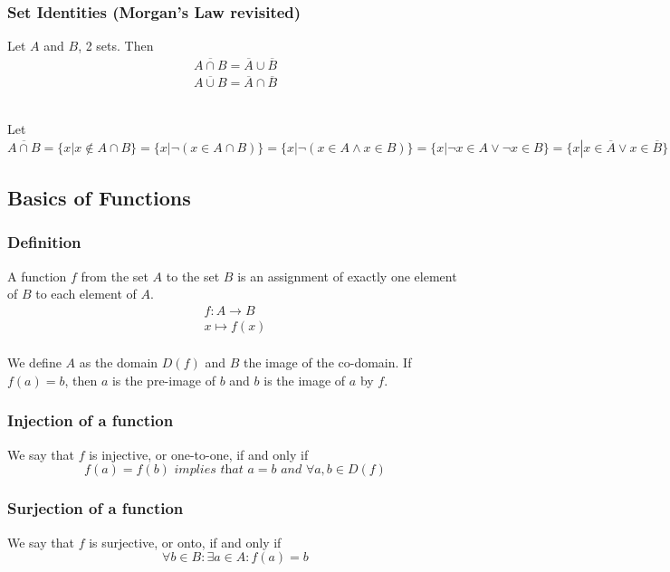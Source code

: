 \documentclass{article}
\begin{document}
\subsubsection{Set Identities (Morgan's Law revisited)} Let $ A $ and $ B $, 2 sets. Then
\begin{align}
\overline{A \cap B} = \overline{A} \cup \overline{B}\\
\overline{A \cup B} = \overline{A} \cap \overline{B}
\end{align}
\\
\begin{tcolorbox}[width=12.1cm]
Let $ \overline{A \cap B} = \{x | x \notin A \cap B\} = \{x | \neg(x \in A \cap B)\} = \{x | \neg(x \in A \wedge x \in B)\} = \{x | \neg x \in A \vee \neg x \in B\} = \{x | x \in \overline{A} \vee x \in \overline{B}\} = \{x | x \in \overline{A} \cup \overline{B}\} = \overline{A} \cup \overline{B} $
\end{tcolorbox}

\subsection{Basics of Functions}
\subsubsection{Definition} A function $ f $ from the set $ A $ to the set $ B $ is an assignment of exactly one element of $ B $ to each element of $ A $.
\begin{align}
f: A \rightarrow B\\
x \longmapsto f(x)
\end{align}
\\
We define $ A $ as the domain $ D(f) $ and $ B $ the image of the co-domain. If $ f(a) = b $, then $ a $ is the pre-image of $ b $ and $ b $ is the image of $ a $ by $ f $.

\subsubsection{Injection of a function} We say that $ f $ is injective, or one-to-one, if and only if
\begin{equation}
f(a) = f(b) \textit{ implies that  } a = b \textit{ and } \forall a,b \in D(f)
\end{equation}

\subsubsection{Surjection of a function} We say that $ f $ is surjective, or onto, if and only if
\begin{equation}
\forall b \in B: \exists a \in A: f(a) = b
\end{equation}
\end{document}
